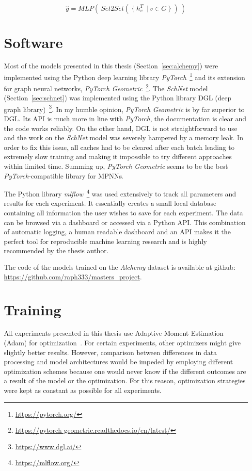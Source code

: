 \begin{equation}
		\hat{y} = MLP(~Set2Set(~\{~h_v^T\ ~|~ v \in G~\}~)~)
\end{equation}

\section{Software}

Most of the models presented in this thesis (Section~\ref{sec:alchemy}) were implemented using the Python deep learning library \textit{PyTorch}~\footnote{\url{https://pytorch.org/}} and its extension for graph neural networks, \textit{PyTorch Geometric}~\footnote{\url{https://pytorch-geometric.readthedocs.io/en/latest/}}. The \textit{SchNet} model (Section~\ref{sec:schnet}) was implemented using the Python library DGL (deep graph library)~\footnote{\url{https://www.dgl.ai/}}. In my humble opinion, \textit{PyTorch Geometric} is by far superior to DGL. Its API is much more in line with \textit{PyTorch}, the documentation is clear and the code works reliably. On the other hand, DGL is not straightforward to use and the work on the \textit{SchNet} model was severely hampered by a memory leak. In order to fix this issue, all caches had to be cleared after each batch leading to extremely slow training and making it impossible to try different approaches within limited time. Summing up, \textit{PyTorch Geometric} seems to be the best \textit{PyTorch}-compatible library for MPNNs.

The Python library \textit{mlflow}~\footnote{\url{https://mlflow.org/}} was used extensively to track all parameters and results for each experiment. It essentially creates a small local database containing all information the user wishes to save for each experiment. The data can be browsed via a dashboard or accessed via a Python API. This combination of automatic logging, a human readable dashboard and an API makes it the perfect tool for reproducible machine learning research and is highly recommended by the thesis author.

The code of the models trained on the \textit{Alchemy} dataset is available at github: \url{https://github.com/raph333/masters\_project}.



\section{Training}
\label{sec:training}

All experiments presented in this thesis use Adaptive Moment Estimation (Adam) for optimization~\cite{Kingma2015}. For certain experiments, other optimizers might give slightly better results. However, comparison between differences in data processing and model architectures would be impeded by employing different optimization schemes because one would never know if the different outcomes are a result of the model or the optimization. For this reason, optimization strategies were kept as constant as possible for all experiments.

